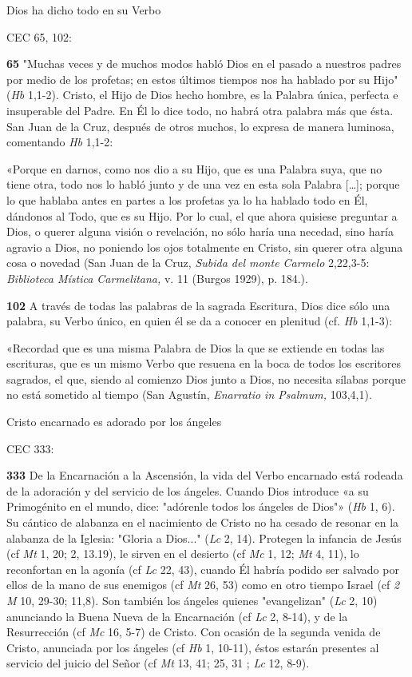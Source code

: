 \documentclass[]{article}
\begin{document}
Dios ha dicho todo en su Verbo

CEC 65, 102:

\textbf{65} "Muchas veces y de muchos modos habló Dios en el pasado a
nuestros padres por medio de los profetas; en estos últimos tiempos nos
ha hablado por su Hijo" (\emph{Hb} 1,1-2). Cristo, el Hijo de Dios hecho
hombre, es la Palabra única, perfecta e insuperable del Padre. En Él lo
dice todo, no habrá otra palabra más que ésta. San Juan de la Cruz,
después de otros muchos, lo expresa de manera luminosa, comentando
\emph{Hb} 1,1-2:

«Porque en darnos, como nos dio a su Hijo, que es una Palabra suya, que
no tiene otra, todo nos lo habló junto y de una vez en esta sola Palabra
[\ldots{}]; porque lo que hablaba antes en partes a los profetas ya lo ha
hablado todo en Él, dándonos al Todo, que es su Hijo. Por lo cual, el
que ahora quisiese preguntar a Dios, o querer alguna visión o
revelación, no sólo haría una necedad, sino haría agravio a Dios, no
poniendo los ojos totalmente en Cristo, sin querer otra alguna cosa o
novedad (San Juan de la Cruz, \emph{Subida del monte Carmelo} 2,22,3-5:
\emph{Biblioteca Mística Carmelitana,} v. 11 (Burgos 1929), p. 184.).

\textbf{102} A través de todas las palabras de la sagrada Escritura,
Dios dice sólo una palabra, su Verbo único, en quien él se da a conocer
en plenitud (cf. \emph{Hb} 1,1-3):

«Recordad que es una misma Palabra de Dios la que se extiende en todas
las escrituras, que es un mismo Verbo que resuena en la boca de todos
los escritores sagrados, el que, siendo al comienzo Dios junto a Dios,
no necesita sílabas porque no está sometido al tiempo (San Agustín,
\emph{Enarratio in Psalmum,} 103,4,1).

Cristo encarnado es adorado por los ángeles

CEC 333:

\textbf{333} De la Encarnación a la Ascensión, la vida del Verbo
encarnado está rodeada de la adoración y del servicio de los ángeles.
Cuando Dios introduce «a su Primogénito en el mundo, dice: "adórenle
todos los ángeles de Dios"» (\emph{Hb} 1, 6). Su cántico de alabanza en
el nacimiento de Cristo no ha cesado de resonar en la alabanza de la
Iglesia: "Gloria a Dios..." (\emph{Lc} 2, 14). Protegen la infancia de
Jesús (cf \emph{Mt} 1, 20; 2, 13.19), le sirven en el desierto (cf
\emph{Mc} 1, 12; \emph{Mt} 4, 11), lo reconfortan en la agonía (cf
\emph{Lc} 22, 43), cuando Él habría podido ser salvado por ellos de la
mano de sus enemigos (cf \emph{Mt} 26, 53) como en otro tiempo Israel
(cf \emph{2 M} 10, 29-30; 11,8). Son también los ángeles quienes
"evangelizan" (\emph{Lc} 2, 10) anunciando la Buena Nueva de la
Encarnación (cf \emph{Lc} 2, 8-14), y de la Resurrección (cf \emph{Mc}
16, 5-7) de Cristo. Con ocasión de la segunda venida de Cristo,
anunciada por los ángeles (cf \emph{Hb} 1, 10-11), éstos estarán
presentes al servicio del juicio del Señor (cf \emph{Mt} 13, 41; 25, 31
; \emph{Lc} 12, 8-9).
\end{document}
